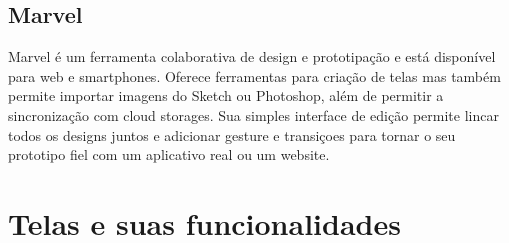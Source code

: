 \subsection{Marvel}

Marvel é um ferramenta colaborativa de design e prototipação e está disponível para web e smartphones. Oferece ferramentas para criação de telas mas também permite importar imagens do Sketch ou Photoshop, além de permitir a sincronização com cloud storages. Sua simples interface de edição permite lincar todos os designs juntos e adicionar gesture e transiçoes para tornar o seu prototipo fiel com um aplicativo real ou um website.

\section{Telas e suas funcionalidades}

